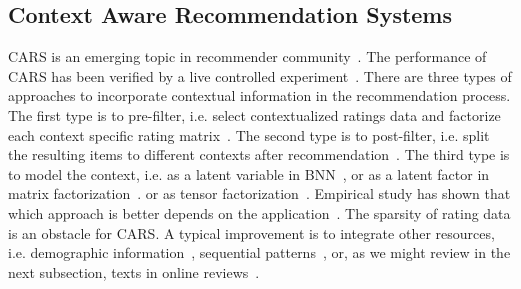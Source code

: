 \documentclass{llncs}
\begin{document}
\subsection{Context Aware Recommendation Systems}
CARS is an emerging topic in recommender community~\cite{Adomavicius2011Context}. The performance of CARS has been verified by a live controlled experiment~\cite{Gorgoglione2011Effect}. There are three types of approaches to incorporate contextual information in the recommendation process. The first type is to pre-filter, i.e. select contextualized ratings data and factorize each context specific rating matrix~\cite{Adomavicius2005Incorporating}. The second type is to post-filter, i.e. split the resulting items to different contexts after recommendation~\cite{Baltrunas2009Context}. The third type is to model the context, i.e. as a latent variable in BNN~\cite{Palmisano2008Using}, or as a latent factor in matrix factorization~\cite{Baltrunas2011Context}. or as tensor factorization~\cite{Wang2015CROWN,Karatzoglou2010Multiverse}. Empirical study has shown that which approach is better depends on the application~\cite{Panniello2009Experimental}. The sparsity of rating data is an obstacle for CARS. A typical improvement is to integrate other resources, i.e. demographic information~\cite{Li2011Towards}, sequential patterns~\cite{Hariri2012Context}, or, as we might review in the next subsection, texts in online reviews~\cite{Li2010Contextual,Levi2012Finding,Hariri2013Query,Liu2013Combining}.
\end{document}
